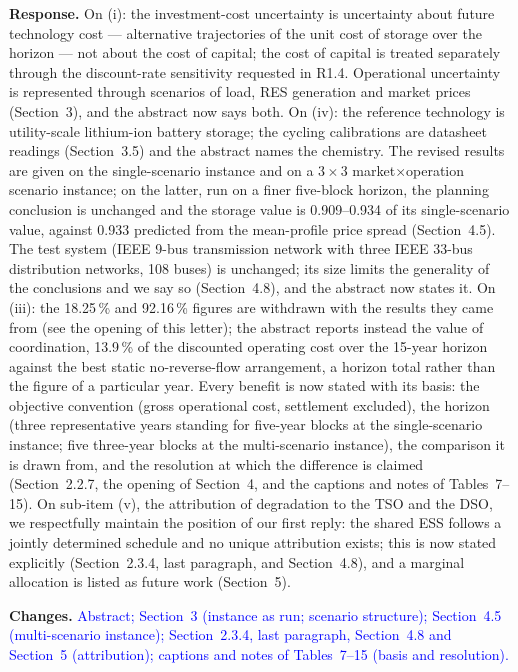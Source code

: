 \documentclass[11pt]{article}
\newcommand{\rresponse}[1]{\noindent\textbf{Response.} #1\par\smallskip}
\newcommand{\rchanges}[1]{\noindent\textbf{Changes.} \textcolor{blue}{#1}\par\medskip}
\begin{document}
\rresponse{
On (i): the investment-cost uncertainty is uncertainty about future technology cost --- alternative trajectories of the unit cost of storage over the horizon --- not about the cost of capital; the cost of capital is treated separately through the discount-rate sensitivity requested in R1.4. Operational uncertainty is represented through scenarios of load, RES generation and market prices (Section~3), and
the abstract now says both. 
On (iv): the reference technology is utility-scale lithium-ion battery storage; the cycling calibrations are datasheet readings (Section~3.5) and the abstract names the chemistry. The revised results are given on the single-scenario instance and on a $3\times3$ market$\times$operation scenario instance; 
on the latter, run on a finer five-block horizon, the planning conclusion is unchanged and the storage value is 0.909--0.934 of its single-scenario value, against 0.933 predicted from the mean-profile price spread (Section~4.5). The test system (IEEE 9-bus transmission network with three IEEE 33-bus distribution networks, 108 buses) is unchanged; its size
limits the generality of the conclusions and we say so (Section~4.8), and the abstract now states it.
On (iii): the 18.25\,\% and 92.16\,\% figures are withdrawn with the results they came from (see the opening of this letter); the abstract reports instead the value of coordination, 13.9\,\% of the discounted operating cost over the 15-year horizon against the best static no-reverse-flow arrangement, a horizon total rather than the figure of a particular year.
Every benefit is now stated with its basis: the objective convention (gross operational cost, settlement excluded), the horizon (three representative years standing for five-year blocks at the single-scenario instance; five three-year blocks at the multi-scenario instance), the comparison it is drawn from, and the resolution at which the difference is claimed (Section~2.2.7, the opening of Section~4, and the captions and notes of Tables~7--15).
On sub-item (v), the attribution of degradation to the TSO and the DSO, we respectfully maintain the position of our first reply: the shared ESS follows a jointly determined schedule and no unique attribution exists; this is now stated explicitly (Section~2.3.4, last paragraph, and Section~4.8), and a marginal allocation is listed as future work (Section~5).
}

\rchanges{Abstract; Section~3 (instance as run; scenario structure); Section~4.5 (multi-scenario instance);
Section~2.3.4, last paragraph, Section~4.8 and Section~5 (attribution); captions and notes of Tables~7--15 (basis and resolution).}
\end{document}

